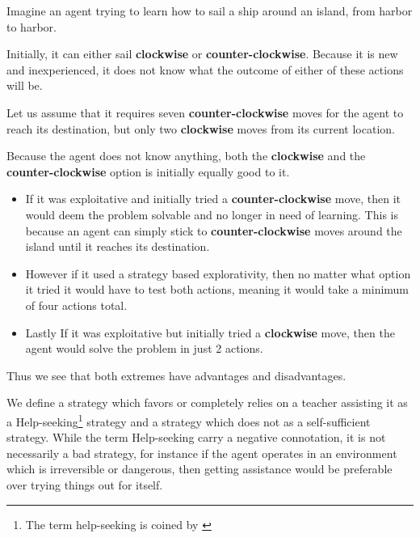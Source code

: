 \documentclass[\master/Master.tex]{subfiles}
\begin{document}
	\begin{example}
		Imagine an agent trying to learn how to sail a ship around an island, from harbor to harbor.
		
		Initially, it can either sail \textbf{clockwise} or \textbf{counter-clockwise}. Because it is new and inexperienced, it does not know what the outcome of either of these actions will be. 
		
		Let us assume that it requires seven \textbf{counter-clockwise} moves for the agent to reach its destination, but only two \textbf{clockwise} moves from its current location.
		
		Because the agent does not know anything, both the \textbf{clockwise} and the \textbf{counter-clockwise} option is initially equally good to it.
		
		\begin{itemize}
			\item If it was exploitative and initially tried a \textbf{counter-clockwise} move, then it would deem the problem solvable and no longer in need of learning. This is because an agent can simply stick to \textbf{counter-clockwise} moves around the island until it reaches its destination. 
			
			\item However if it used a strategy based explorativity, then no matter what option it tried it would have to test both actions, meaning it would take a minimum of four actions total.
			
			\item Lastly If it was exploitative but initially tried a \textbf{clockwise} move, then the agent would solve the problem in just 2 actions.
		\end{itemize}
		
		Thus we see that both extremes have advantages and disadvantages.
		
	\end{example}
	
	\begin{definition}
     We define a strategy which favors
    or completely relies on a teacher assisting it as a Help-seeking\footnote{The term help-seeking is coined by \cite{Gall1981224}} strategy
    and a strategy which does not as a self-sufficient strategy. While
    the term Help-seeking carry a negative connotation, it is not necessarily
    a bad strategy, for instance if the agent operates in an environment
    which is irreversible or dangerous, then getting assistance would
    be preferable over trying things out for itself. 

    \end{definition}
    
\end{document}
